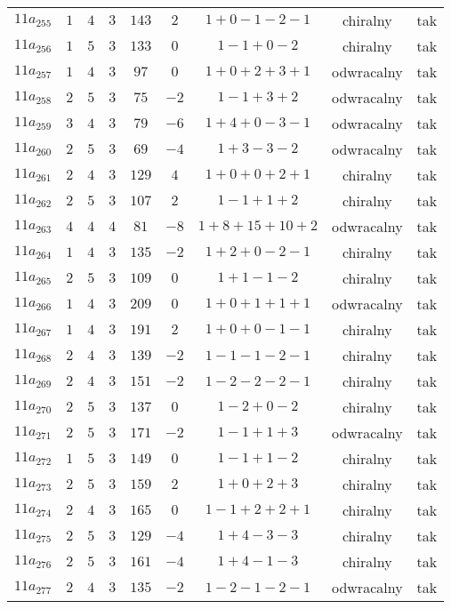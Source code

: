 \begin{longtable}{ccccccccc}
$11a_{255}$ & $1$ & $4$ & $3$ & $143$ & $2$ & $1+0-1-2-1$ & chiralny & tak \\
$11a_{256}$ & $1$ & $5$ & $3$ & $133$ & $0$ & $1-1+0-2$ & chiralny & tak \\
$11a_{257}$ & $1$ & $4$ & $3$ & $97$ & $0$ & $1+0+2+3+1$ & odwracalny & tak \\
$11a_{258}$ & $2$ & $5$ & $3$ & $75$ & $-2$ & $1-1+3+2$ & odwracalny & tak \\
$11a_{259}$ & $3$ & $4$ & $3$ & $79$ & $-6$ & $1+4+0-3-1$ & odwracalny & tak \\
$11a_{260}$ & $2$ & $5$ & $3$ & $69$ & $-4$ & $1+3-3-2$ & odwracalny & tak \\
$11a_{261}$ & $2$ & $4$ & $3$ & $129$ & $4$ & $1+0+0+2+1$ & chiralny & tak \\
$11a_{262}$ & $2$ & $5$ & $3$ & $107$ & $2$ & $1-1+1+2$ & chiralny & tak \\
$11a_{263}$ & $4$ & $4$ & $4$ & $81$ & $-8$ & $1+8+15+10+2$ & odwracalny & tak \\
$11a_{264}$ & $1$ & $4$ & $3$ & $135$ & $-2$ & $1+2+0-2-1$ & chiralny & tak \\
$11a_{265}$ & $2$ & $5$ & $3$ & $109$ & $0$ & $1+1-1-2$ & chiralny & tak \\
$11a_{266}$ & $1$ & $4$ & $3$ & $209$ & $0$ & $1+0+1+1+1$ & odwracalny & tak \\
$11a_{267}$ & $1$ & $4$ & $3$ & $191$ & $2$ & $1+0+0-1-1$ & chiralny & tak \\
$11a_{268}$ & $2$ & $4$ & $3$ & $139$ & $-2$ & $1-1-1-2-1$ & chiralny & tak \\
$11a_{269}$ & $2$ & $4$ & $3$ & $151$ & $-2$ & $1-2-2-2-1$ & chiralny & tak \\
$11a_{270}$ & $2$ & $5$ & $3$ & $137$ & $0$ & $1-2+0-2$ & chiralny & tak \\
$11a_{271}$ & $2$ & $5$ & $3$ & $171$ & $-2$ & $1-1+1+3$ & odwracalny & tak \\
$11a_{272}$ & $1$ & $5$ & $3$ & $149$ & $0$ & $1-1+1-2$ & chiralny & tak \\
$11a_{273}$ & $2$ & $5$ & $3$ & $159$ & $2$ & $1+0+2+3$ & chiralny & tak \\
$11a_{274}$ & $2$ & $4$ & $3$ & $165$ & $0$ & $1-1+2+2+1$ & chiralny & tak \\
$11a_{275}$ & $2$ & $5$ & $3$ & $129$ & $-4$ & $1+4-3-3$ & chiralny & tak \\
$11a_{276}$ & $2$ & $5$ & $3$ & $161$ & $-4$ & $1+4-1-3$ & chiralny & tak \\
$11a_{277}$ & $2$ & $4$ & $3$ & $135$ & $-2$ & $1-2-1-2-1$ & odwracalny & tak \\

\end{longtable}

